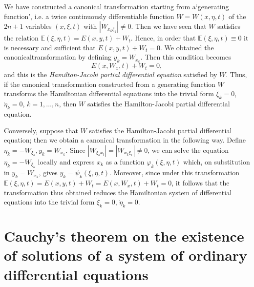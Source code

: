 We have constructed a canonical transformation starting from a\break `generating function', i.e. a twice continuously differentiable function $W = W(x, \eta, t)$ of the $2n+1$ variables $(x, \xi, t)$ with $|W_{x_k \xi_1}| \neq 0$. Then we have seen that $W$ satisfies the relation $\mathbb{E}(\xi, \eta, t) = E(x,y,t) + W_t$. Hence, in order that $\mathbb{E} (\xi, \eta, t) \equiv 0$ it is necessary and sufficient that $E(x,y,t) + W_t = 0$. We obtained the canonical\pageoriginale transformation by defining $y_k = W_{x_k}$. Then this condition becomes
\begin{equation*}
E(x, W_x, t) + W_t = 0,\tag{1.2.15}\label{chap1:eq1.2.15}
\end{equation*}
and this is the {\em Hamilton-Jacobi partial differential equation} satisfied by $W$. Thus, if the canonical transformation constructed from a generating function $W$ transforms the Hamiltonian differential equations into the trivial form $\dot{\xi}_k = 0$, $\dot{\eta}_k = 0$, $k=1, \ldots, n$, then $W$ satisfies the Hamilton-Jacobi partial differential equation.

Conversely, suppose that $W$ satisfies the Hamilton-Jacobi partial differential equation; then we obtain a canonical transformation in the following way. Define $\eta_k = - W_{\xi_k}, y_k = W_{x_k}$. Since $|W_{\xi_k x_l}| = |W_{x_k \xi_1}| \neq 0$, we can solve the equation $\eta_k = - W_{\xi_k}$ locally and express $x_k$ as a function $\varphi_k(\xi, \eta, t)$ which, on substitution in $y_k = W_{x_k}$, gives $y_k = \psi_k(\xi, \eta, t)$. Moreover, since under this transformation $\mathbb{E}(\xi, \eta, t) = E(x,y,t)+ W_t = E(x, W_x, t) + W_t = 0$, it follows that the transformation thus obtained reduces the Hamiltonian system of differential equations into the trivial form $\dot{\xi}_k = 0$, $\dot{\eta}_k = 0$. 

\section[Cauchy's theorem on the existence of solutions...]{Cauchy's
  theorem on the existence of solutions of a system of ordinary
  differential equations}\label{chap1:sec3} 

